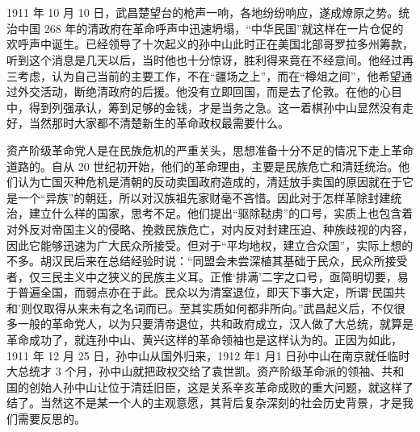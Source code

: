 \chapter{}

1911 年 10 月 10 日，武昌楚望台的枪声一响，各地纷纷响应，遂成燎原之势。统治中国 268 年的清政府在革命呼声中迅速坍塌，“中华民国”就这样在一片仓促的欢呼声中诞生。已经领导了十次起义的孙中山此时正在美国北部哥罗拉多州筹款，听到这个消息是几天以后，当时他也十分惊讶，胜利得来竟在不经意间。他经过再三考虑，认为自己当前的主要工作，不在“疆场之上”，而在“樽俎之间”，他希望通过外交活动，断绝清政府的后援。他没有立即回国，而是去了伦敦。在他的心目中，得到列强承认，筹到足够的金钱，才是当务之急。这一着棋孙中山显然没有走好，当然那时大家都不清楚新生的革命政权最需要什么。

资产阶级革命党人是在民族危机的严重关头，思想准备十分不足的情况下走上革命道路的。自从 20 世纪初开始，他们的革命理由，主要是民族危亡和清廷统治。他们认为亡国灭种危机是清朝的反动卖国政府造成的，清廷放手卖国的原因就在于它是一个“异族”的朝廷，所以对汉族祖先家财毫不吝惜。因此对于怎样革除封建统治，建立什么样的国家，思考不足。他们提出“驱除鞑虏”的口号，实质上也包含着对外反对帝国主义的侵略、挽救民族危亡，对内反对封建压迫、种族歧视的内容，因此它能够迅速为广大民众所接受。但对于“平均地权，建立合众国”，实际上想的不多。胡汉民后来在总结经验时说：“同盟会未尝深植其基础于民众，民众所接受者，仅三民主义中之狭义的民族主义耳。正惟‘排满’二字之口号，亟简明切要，易于普遍全国，而弱点亦在于此。民众以为清室退位，即天下事大定，所谓‘民国共和’则仅取得从来未有之名词而已。至其实质如何都非所向。”武昌起义后，不仅很多一般的革命党人，以为只要清帝退位，共和政府成立，汉人做了大总统，就算是革命成功了，就连孙中山、黄兴这样的革命领袖也是这样认为的。正因为如此，1911 年 12 月 25 日，孙中山从国外归来，1912 年1 月1 日孙中山在南京就任临时大总统才 3 个月，孙中山就把政权交给了袁世凯。资产阶级革命派的领袖、共和国的创始人孙中山让位于清廷旧臣，这是关系辛亥革命成败的重大问题，就这样了结了。当然这不是某一个人的主观意愿，其背后复杂深刻的社会历史背景，才是我们需要反思的。

